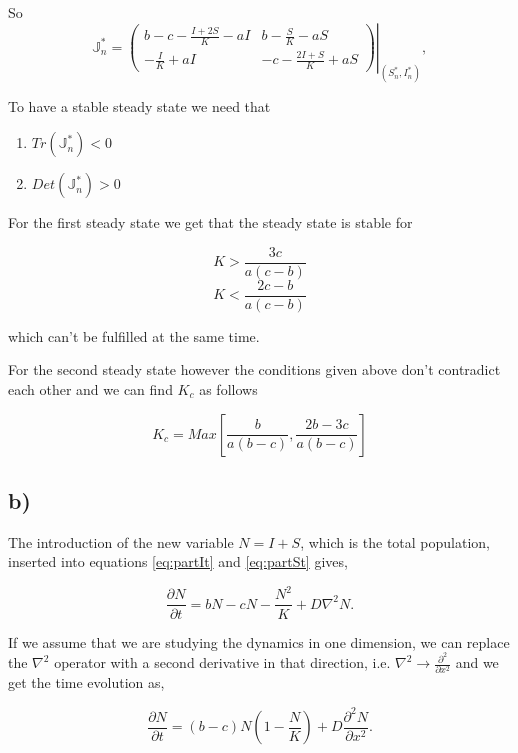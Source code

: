 So
\begin{equation}
\mathbb{J}^*_n=\left.\left(
\begin{array}{cc}
b-c-\frac{I+2S}{K}-aI & b-\frac{S}{K}-aS \\
-\frac{I}{K} +aI & -c -\frac{2I+S}{K}+aS
\end{array}\right)\right|_{(S^*_n,I^*_n)},
\end{equation}

To have a stable steady state we need that 

\begin{enumerate}
\item $Tr(\mathbb{J}^*_n)<0$
\item $Det(\mathbb{J}^*_n)>0$
\end{enumerate}


For the first steady state we get that the steady state is stable for

$$
K>\frac{3c}{a(c-b)}
$$$$
K<\frac{2c-b}{a(c-b)}
$$

which can't be fulfilled at the same time.

For the second steady state however the conditions given above don't contradict each other and we can find $K_c$ as follows

\begin{equation}
K_c=Max\left[\frac{b}{a(b-c)},\frac{2b-3c}{a(b-c)}\right]
\end{equation}

\subsection*{b)}

The introduction of the new variable $N=I+S$, which is the total population, inserted into equations \eqref{eq:partIt} and \eqref{eq:partSt} gives,

\begin{equation}
\frac{\partial N}{\partial t}=bN -cN -\frac{N^2}{K}+D\nabla^2N.
\end{equation}

If we assume that we are studying the dynamics in one dimension, we can replace the $\nabla^2$ operator with a second derivative in that direction, i.e. $\nabla^2\rightarrow \frac{\partial^2}{\partial x^2}$ and we get the time evolution as,

\begin{equation}
\frac{\partial N}{\partial t}=(b-c)N\left(1-\frac{N}{K}\right)+D\frac{\partial^2 N}{\partial x^2}.
\end{equation}

